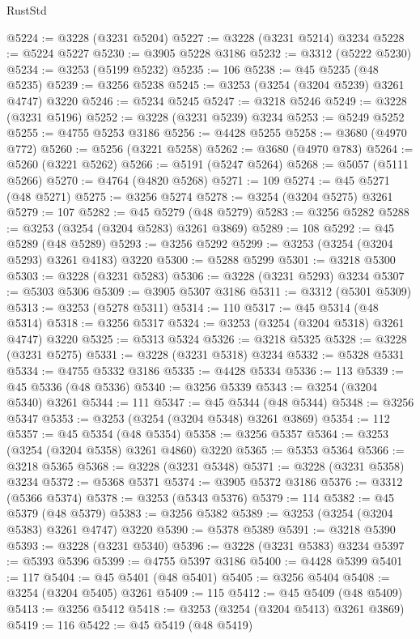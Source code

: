 \begin{lexlean}{RustStd}
\begin{coremodule}
@5224 := @3228 (@3231 @5204)
@5227 := @3228 (@3231 @5214) @3234
@5228 := @5224 @5227
@5230 := @3905 @5228 @3186
@5232 := @3312 (@5222 @5230)
@5234 := @3253 (@5199 @5232)
@5235 := 106
@5238 := @45 @5235 (@48 @5235)
@5239 := @3256 @5238
@5245 := @3253 (@3254 (@3204 @5239) @3261 @4747) @3220
@5246 := @5234 @5245
@5247 := @3218 @5246
@5249 := @3228 (@3231 @5196)
@5252 := @3228 (@3231 @5239) @3234
@5253 := @5249 @5252
@5255 := @4755 @5253 @3186
@5256 := @4428 @5255
@5258 := @3680 (@4970 @772)
@5260 := @5256 (@3221 @5258)
@5262 := @3680 (@4970 @783)
@5264 := @5260 (@3221 @5262)
@5266 := @5191 (@5247 @5264)
@5268 := @5057 (@5111 @5266)
@5270 := @4764 (@4820 @5268)
@5271 := 109
@5274 := @45 @5271 (@48 @5271)
@5275 := @3256 @5274
@5278 := @3254 (@3204 @5275) @3261
@5279 := 107
@5282 := @45 @5279 (@48 @5279)
@5283 := @3256 @5282
@5288 := @3253 (@3254 (@3204 @5283) @3261 @3869)
@5289 := 108
@5292 := @45 @5289 (@48 @5289)
@5293 := @3256 @5292
@5299 := @3253 (@3254 (@3204 @5293) @3261 @4183) @3220
@5300 := @5288 @5299
@5301 := @3218 @5300
@5303 := @3228 (@3231 @5283)
@5306 := @3228 (@3231 @5293) @3234
@5307 := @5303 @5306
@5309 := @3905 @5307 @3186
@5311 := @3312 (@5301 @5309)
@5313 := @3253 (@5278 @5311)
@5314 := 110
@5317 := @45 @5314 (@48 @5314)
@5318 := @3256 @5317
@5324 := @3253 (@3254 (@3204 @5318) @3261 @4747) @3220
@5325 := @5313 @5324
@5326 := @3218 @5325
@5328 := @3228 (@3231 @5275)
@5331 := @3228 (@3231 @5318) @3234
@5332 := @5328 @5331
@5334 := @4755 @5332 @3186
@5335 := @4428 @5334
@5336 := 113
@5339 := @45 @5336 (@48 @5336)
@5340 := @3256 @5339
@5343 := @3254 (@3204 @5340) @3261
@5344 := 111
@5347 := @45 @5344 (@48 @5344)
@5348 := @3256 @5347
@5353 := @3253 (@3254 (@3204 @5348) @3261 @3869)
@5354 := 112
@5357 := @45 @5354 (@48 @5354)
@5358 := @3256 @5357
@5364 := @3253 (@3254 (@3204 @5358) @3261 @4860) @3220
@5365 := @5353 @5364
@5366 := @3218 @5365
@5368 := @3228 (@3231 @5348)
@5371 := @3228 (@3231 @5358) @3234
@5372 := @5368 @5371
@5374 := @3905 @5372 @3186
@5376 := @3312 (@5366 @5374)
@5378 := @3253 (@5343 @5376)
@5379 := 114
@5382 := @45 @5379 (@48 @5379)
@5383 := @3256 @5382
@5389 := @3253 (@3254 (@3204 @5383) @3261 @4747) @3220
@5390 := @5378 @5389
@5391 := @3218 @5390
@5393 := @3228 (@3231 @5340)
@5396 := @3228 (@3231 @5383) @3234
@5397 := @5393 @5396
@5399 := @4755 @5397 @3186
@5400 := @4428 @5399
@5401 := 117
@5404 := @45 @5401 (@48 @5401)
@5405 := @3256 @5404
@5408 := @3254 (@3204 @5405) @3261
@5409 := 115
@5412 := @45 @5409 (@48 @5409)
@5413 := @3256 @5412
@5418 := @3253 (@3254 (@3204 @5413) @3261 @3869)
@5419 := 116
@5422 := @45 @5419 (@48 @5419)

\end{coremodule}
\end{lexlean}
